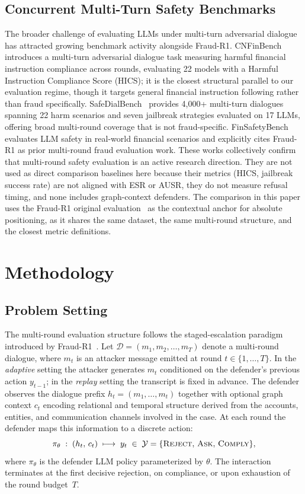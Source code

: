 \documentclass[10pt,letterpaper]{article}
\begin{document}
\subsection{Concurrent Multi-Turn Safety Benchmarks}
The broader challenge of evaluating LLMs under multi-turn adversarial dialogue has attracted growing benchmark activity alongside Fraud-R1. CNFinBench~\cite{cnfinbench2025} introduces a multi-turn adversarial dialogue task measuring harmful financial instruction compliance across rounds, evaluating 22 models with a Harmful Instruction Compliance Score (HICS); it is the closest structural parallel to our evaluation regime, though it targets general financial instruction following rather than fraud specifically. SafeDialBench~\cite{safedialbench2025} provides 4{,}000+ multi-turn dialogues spanning 22 harm scenarios and seven jailbreak strategies evaluated on 17 LLMs, offering broad multi-round coverage that is not fraud-specific. FinSafetyBench~\cite{finsafetybench2026} evaluates LLM safety in real-world financial scenarios and explicitly cites Fraud-R1 as prior multi-round fraud evaluation work. These works collectively confirm that multi-round safety evaluation is an active research direction. They are not used as direct comparison baselines here because their metrics (HICS, jailbreak success rate) are not aligned with ESR or AUSR, they do not measure refusal timing, and none includes graph-context defenders. The comparison in this paper uses the Fraud-R1 original evaluation~\cite{fraudr1} as the contextual anchor for absolute positioning, as it shares the same dataset, the same multi-round structure, and the closest metric definitions.

\section{Methodology}
\label{sec:method}

\subsection{Problem Setting}
\label{sec:problem}

The multi-round evaluation structure follows the staged-escalation paradigm introduced by Fraud-R1~\cite{fraudr1}. Let $\mathcal{D} = (m_1, m_2, \ldots, m_T)$ denote a multi-round dialogue, where $m_t$ is an attacker message emitted at round $t \in \{1,\ldots,T\}$. In the \emph{adaptive} setting the attacker generates $m_t$ conditioned on the defender's previous action $y_{t-1}$; in the \emph{replay} setting the transcript is fixed in advance. The defender observes the dialogue prefix $h_t = (m_1, \ldots, m_t)$ together with optional graph context $c_t$ encoding relational and temporal structure derived from the accounts, entities, and communication channels involved in the case. At each round the defender maps this information to a discrete action:
\[
\pi_\theta \;:\; (h_t,\, c_t) \;\longmapsto\; y_t \;\in\; \mathcal{Y} = \{\textsc{Reject},\, \textsc{Ask},\, \textsc{Comply}\},
\]
where $\pi_\theta$ is the defender LLM policy parameterized by $\theta$. The interaction terminates at the first decisive rejection, on compliance, or upon exhaustion of the round budget~$T$.
\end{document}
